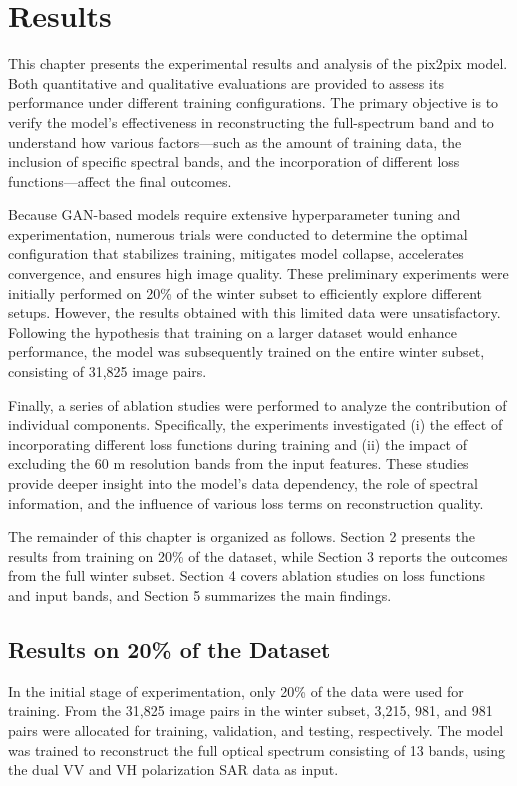 \chapter{Results}
This chapter presents the experimental results and analysis of the pix2pix model. Both quantitative and qualitative evaluations are provided to assess its performance under different training configurations. The primary objective is to verify the model’s effectiveness in reconstructing the full-spectrum band and to understand how various factors—such as the amount of training data, the inclusion of specific spectral bands, and the incorporation of different loss functions—affect the final outcomes.

Because GAN-based models require extensive hyperparameter tuning and experimentation, numerous trials were conducted to determine the optimal configuration that stabilizes training, mitigates model collapse, accelerates convergence, and ensures high image quality. These preliminary experiments were initially performed on 20\% of the winter subset to efficiently explore different setups. However, the results obtained with this limited data were unsatisfactory. Following the hypothesis that training on a larger dataset would enhance performance, the model was subsequently trained on the entire winter subset, consisting of 31,825 image pairs.

Finally, a series of ablation studies were performed to analyze the contribution of individual components. Specifically, the experiments investigated (i) the effect of incorporating different loss functions during training and (ii) the impact of excluding the 60 m resolution bands from the input features. These studies provide deeper insight into the model’s data dependency, the role of spectral information, and the influence of various loss terms on reconstruction quality.

The remainder of this chapter is organized as follows. Section 2 presents the results from training on 20\% of the dataset, while Section 3 reports the outcomes from the full winter subset. Section 4 covers ablation studies on loss functions and input bands, and Section 5 summarizes the main findings.

\section{Results on 20\% of the Dataset}
In the initial stage of experimentation, only 20\% of the data were used for training. From the 31,825 image pairs in the winter subset, 3,215, 981, and 981 pairs were allocated for training, validation, and testing, respectively. The model was trained to reconstruct the full optical spectrum consisting of 13 bands, using the dual VV and VH polarization SAR data as input.

